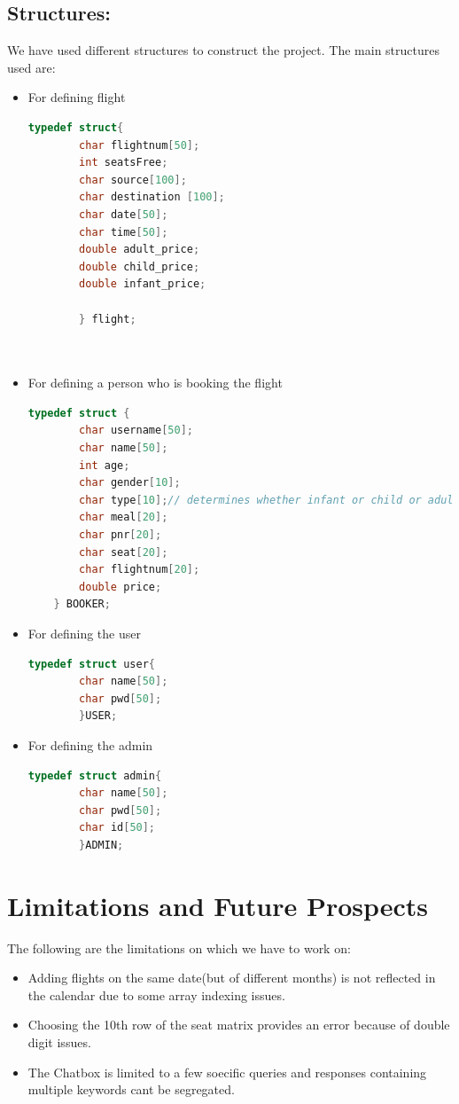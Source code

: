 \documentclass[a4paper]{scrartcl}
\begin{document}
\subsection{Structures:}
We have used different structures to construct the project. The main structures used are:
\begin{itemize}
    \item For defining flight
    \begin{lstlisting}[language=C]
        typedef struct{
        char flightnum[50];
        int seatsFree;
        char source[100];
        char destination [100];
        char date[50]; 
        char time[50];
        double adult_price;
        double child_price;
        double infant_price;
        
        } flight;
    
        
    \end{lstlisting}
    \item For defining a person who is booking the flight
    \begin{lstlisting}[language=C]
        typedef struct {
        char username[50];
        char name[50];
        int age;
        char gender[10];
        char type[10];// determines whether infant or child or adult
        char meal[20];
        char pnr[20];
        char seat[20];
        char flightnum[20];
        double price;
    } BOOKER;

    \end{lstlisting}
    \item For defining the user
    \begin{lstlisting}[language=C]
        typedef struct user{
        char name[50];
        char pwd[50];
        }USER;
    \end{lstlisting}
    \item For defining the admin
    \begin{lstlisting}[language=C]
        typedef struct admin{
        char name[50];
        char pwd[50];
        char id[50];
        }ADMIN;
    \end{lstlisting}
\end{itemize}






\section{Limitations and Future Prospects}
The following are the limitations on which we have to work on:
\begin{itemize}
    \item Adding flights on the same date(but of different months) is not reflected in the calendar due to some array indexing issues.
    \item Choosing the 10th row of the seat matrix provides an error because of double digit issues.
    \item The Chatbox is limited to a few soecific queries and responses containing multiple keywords cant be segregated.
\end{itemize}
\end{document}
